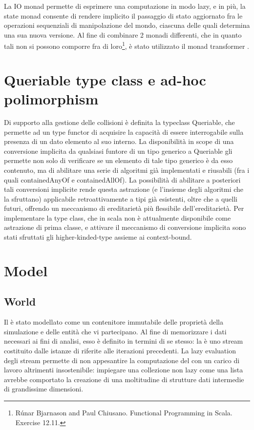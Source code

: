 La IO monad permette di esprimere una computazione in modo lazy, e in più, la state monad consente di rendere implicito il passaggio di stato aggiornato fra le operazioni sequenziali di manipolazione del mondo, ciascuna delle quali determina una sua nuova versione. Al fine di combinare 2 monadi differenti, che in quanto tali non si possono comporre fra di loro\footnote{Rúnar Bjarnason and Paul Chiusano. Functional Programming in Scala. Exercise 12.11.}, è stato utilizzato il monad transformer .

\section{Queriable type class e ad-hoc polimorphism}
Di supporto alla gestione delle collisioni è definita la typeclass Queriable, che permette ad un type functor di acquisire la capacità di essere interrogabile sulla presenza di un dato elemento al suo interno. La disponibilità in scope di una conversione implicita da qualsiasi funtore di un tipo generico a Queriable gli permette non solo di verificare se un elemento di tale tipo generico è da esso contenuto, ma di abilitare una serie di algoritmi già implementati e riusabili (fra i quali containedAnyOf e containedAllOf). La possibilità di abilitare a posteriori tali conversioni implicite rende questa astrazione (e l’insieme degli algoritmi che la sfruttano) applicabile retroattivamente a tipi già esistenti, oltre che a quelli futuri, offrendo un meccanismo di ereditarietà più flessibile dell’ereditarietà. Per implementare la type class, che in scala non è attualmente disponibile come astrazione di prima classe, e attivare il meccanismo di conversione implicita sono stati sfruttati gli higher-kinded-type assieme ai context-bound.

\section{Model}

\subsection{World}
Il  è stato modellato come un contenitore immutabile delle proprietà della simulazione e delle entità che vi partecipano. Al fine di memorizzare i dati necessari ai fini di analisi, esso è definito in termini di se stesso: la  è uno stream costituito dalle istanze di  riferite alle iterazioni precedenti. La lazy evaluation degli stream permette di non appesantire la computazione del  con un carico di lavoro altrimenti insostenibile: impiegare una collezione non lazy come una lista avrebbe comportato la creazione di una moltitudine di strutture dati intermedie di grandissime dimensioni. 


